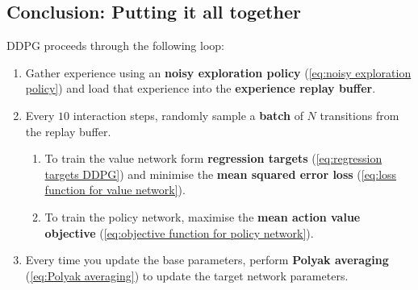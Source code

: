 \documentclass[]{article}
\begin{document}
\subsection*{Conclusion: Putting it all together}
DDPG proceeds through the following loop:
\begin{enumerate}
	\item Gather experience using an \textbf{noisy exploration policy} (\ref{eq:noisy exploration policy}) and load that experience into the \textbf{experience replay buffer}. 
	\item Every $10$ interaction steps, randomly sample a \textbf{batch} of $N$ transitions from the replay buffer.
	\begin{enumerate}
		\item To train the value network form \textbf{regression targets} (\ref{eq:regression targets DDPG}) and minimise the \textbf{mean squared error loss} (\ref{eq:loss function for value network}).
		\item To train the policy network, maximise the \textbf{mean action value objective} (\ref{eq:objective function for policy network}).
	\end{enumerate} 
	\item Every time you update the base parameters, perform \textbf{Polyak averaging} (\ref{eq:Polyak averaging}) to update the target network parameters.
\end{enumerate}
\end{document}
